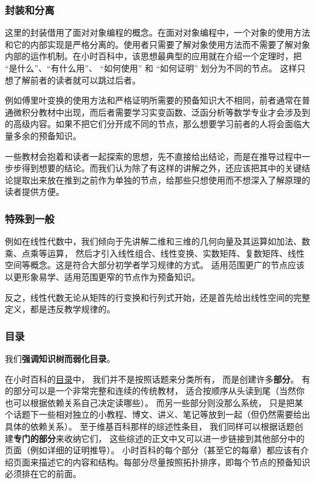 \subsubsection{封装和分离}
这里的封装借用了面对对象编程的概念。在面对对象编程中，一个对象的使用方法和它的内部实现是严格分离的。使用者只需要了解对象使用方法而不需要了解对象内部的运作机制。在小时百科中，该思想最典型的应用就在介绍一个定理时，把 “是什么”、“有什么用”、 “如何使用” 和 “如何证明” 划分为不同的节点。 这样只想了解前者的读者就可以跳过后者。

例如傅里叶变换的使用方法和严格证明所需要的预备知识大不相同，前者通常在普通微积分教材中出现，而后者需要学习实变函数、泛函分析等数学专业才会涉及到的高级内容。如果不把它们分开成不同的节点，那么想要学习前者的人将会面临大量多余的预备知识。

一些教材会抱着和读者一起探索的思想，先不直接给出结论，而是在推导过程中一步步得到想要的结论。而我们认为除了有这样的讲解之外，还应该把其中的关键结论提取出来放在推到之前作为单独的节点，给那些只想使用而不想深入了解原理的读者提供方便。

\subsubsection{特殊到一般}
例如在线性代数中，我们倾向于先讲解二维和三维的几何向量及其运算如加法、数乘、点乘等运算， 然后才引入线性组合、线性变换、实数矩阵、复数矩阵、线性空间等概念。这是符合大部分初学者学习规律的方式。 适用范围更广的节点应该以更形象易学、适用范围更窄的节点作为预备知识。

反之，线性代数无论从矩阵的行变换和行列式开始，还是首先给出线性空间的完整定义，都是违反教学规律的。

\subsubsection{目录}
我们\textbf{强调知识树而弱化目录}。

在小时百科的\href{https://wuli.wiki/online}{目录}中， 我们并不是按照话题来分类所有， 而是创建许多\textbf{部分}。 有的部分可以是一个非常完整和连续的传统教材， 适合按顺序从头读到尾（当然你也可以根据依赖关系自己决定读哪些）。 而另一些部分则没那么系统， 只是把某个话题下一些相对独立的小教程、博文、讲义、笔记等放到一起（但仍然需要给出具体的依赖关系）。 至于维基百科那样的综述性条目， 我们同样可以根据话题创建\textbf{专门的部分}来收纳它们， 这些综述的正文中又可以进一步链接到其他部分中的页面（例如详细的证明推导）。 小时百科的每个部分（甚至它的每章）都应该有介绍页面来描述它的内容和结构。每部分尽量按照拓扑排序，即每个节点的预备知识必须排在它的前面。


